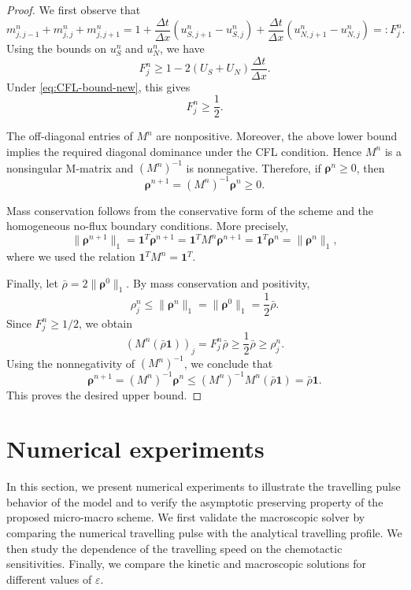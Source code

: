 \documentclass[11pt,twoside]{article}
\numberwithin{equation}{section}
\theoremstyle{plain}
\theoremstyle{nonumberplain}
\newtheorem{proof}{Proof}
\newcommand{\brho}{\boldsymbol{\rho}}
\begin{document}
{\begin{proof}
We first observe that
\[
m_{j,j-1}^n+m_{j,j}^n+m_{j,j+1}^n
=
1+\frac{\Delta t}{\Delta x}
\left(u_{S,j+1}^n-u_{S,j}^n\right)
+\frac{\Delta t}{\Delta x}
\left(u_{N,j+1}^n-u_{N,j}^n\right)
=:F_j^n .
\]
Using the bounds on $u_S^n$ and $u_N^n$, we have
\[
F_j^n
\ge
1-2(U_S+U_N)\frac{\Delta t}{\Delta x}.
\]
Under \eqref{eq:CFL-bound-new}, this gives
\[
F_j^n\ge \frac12 .
\]

The off-diagonal entries of $M^n$ are nonpositive. Moreover, the above
lower bound implies the required diagonal dominance under the CFL
condition. Hence $M^n$ is a nonsingular M-matrix and $(M^n)^{-1}$ is
nonnegative. Therefore, if $\brho^n\ge0$, then
\[
\brho^{n+1}=(M^n)^{-1}\brho^n\ge0.
\]

Mass conservation follows from the conservative form of the scheme and the
homogeneous no-flux boundary conditions.  More precisely, 
\[
\|\brho^{n+1}\|_1
=
\mathbf 1^T\brho^{n+1}
=
\mathbf 1^T M^n\brho^{n+1}
=
\mathbf 1^T\brho^n
=
\|\brho^n\|_1 ,
\]
where we used the relation
\(
\mathbf 1^T M^n=\mathbf 1^T .
\)

Finally, let $\bar\rho=2\|\brho^0\|_1$. By mass conservation and
positivity,
\[
\rho_j^n\le \|\brho^n\|_1=\|\brho^0\|_1=\frac12\bar\rho .
\]
Since $F_j^n\ge1/2$, we obtain
\[
(M^n(\bar\rho\mathbf 1))_j
=
F_j^n\bar\rho
\ge
\frac12\bar\rho
\ge
\rho_j^n .
\]
Using the nonnegativity of $(M^n)^{-1}$, we conclude that
\[
\brho^{n+1}
=
(M^n)^{-1}\brho^n
\le
(M^n)^{-1}M^n(\bar\rho\mathbf 1)
=
\bar\rho\mathbf 1 .
\]
This proves the desired upper bound.
\end{proof}



\section{Numerical experiments}

In this section, we present numerical experiments to illustrate the
travelling pulse behavior of the model and to verify the asymptotic
preserving property of the proposed micro-macro scheme. We first validate
the macroscopic solver by comparing the numerical travelling pulse with
the analytical travelling profile. We then study the dependence of the
travelling speed on the chemotactic sensitivities. Finally, we compare
the kinetic and macroscopic solutions for different values of
\(\varepsilon\).

}
\end{document}
